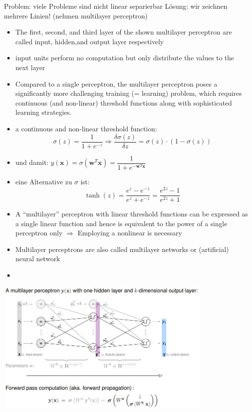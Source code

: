 \documentclass[11pt,a4paper]{article}
\begin{document}
\begin{flushleft}
Problem: viele Probleme sind nicht linear separierbar
Lösung: wir zeichnen mehrere Linien! (nehmen multilayer perceptron)
\begin{itemize}
\item The first, second, and third layer of the shown multilayer perceptron are called input, hidden,and output layer respectively
\item  input units perform no computation but only distribute the values to the next
layer
\item Compared to a single perceptron, the multilayer perceptron poses a significantly more
challenging training (= learning) problem, which requires continuous (and non-linear)
threshold functions along with sophisticated learning strategies.
\item a continuous and non-linear threshold function: 
$$ \sigma(z) = \frac{1}{1+ e^{-z}} \Rightarrow \frac{\delta \sigma (z)}{\delta z} = \sigma(z) \cdot (1- \sigma(z)) $$
\item und damit: $ y(\textbf{x}) = \sigma (\textbf{w}^T\textbf{x}) = \dfrac{1}{1+e^{-\textbf{w}^T\textbf{x}}} $
\item eine Alternative zu $\sigma$ ist: \\
$$ \tanh (z) = \frac{e^z - e^{-z}}{e^z + e^{-z}} = \frac{e^{2z}-1}{e^{2z}+1}$$ 
\item A “multilayer” perceptron with linear threshold functions can be expressed as a single linear
function and hence is equivalent to the power of a single perceptron only $\Rightarrow$ Employing a nonlinear is necessary
\item  Multilayer perceptrons are also called multilayer networks or (artificial) neural network
\item 
\end{itemize}
\includegraphics[width=0.8\textwidth]{MP}

\end{flushleft}
\end{document}
